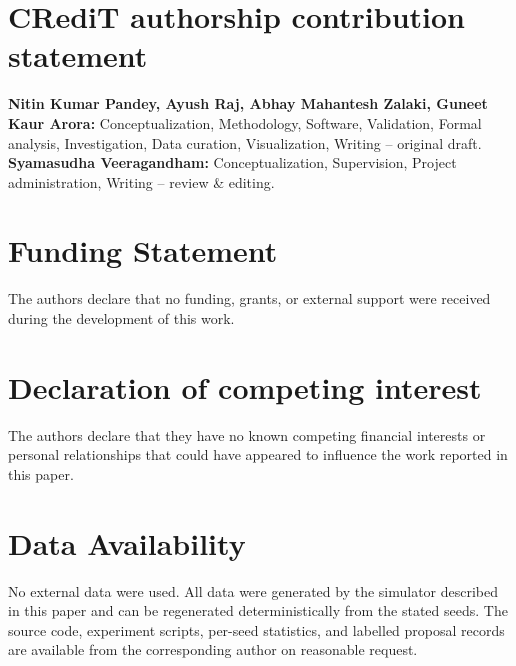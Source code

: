 \documentclass[conference]{IEEEtran}
\begin{document}
\section*{CRediT authorship contribution statement}

\textbf{Nitin Kumar Pandey, Ayush Raj, Abhay Mahantesh Zalaki, Guneet Kaur Arora:} Conceptualization, Methodology, Software, Validation, Formal analysis, Investigation, Data curation, Visualization, Writing -- original draft.
\textbf{Syamasudha Veeragandham:} Conceptualization, Supervision, Project administration, Writing -- review \& editing.

\section*{Funding Statement}

The authors declare that no funding, grants, or external support were received during the development of this work.

\section*{Declaration of competing interest}

The authors declare that they have no known competing financial interests or personal relationships that could have appeared to influence the work reported in this paper.

\section*{Data Availability}

No external data were used. All data were generated by the simulator described in this paper and can be regenerated deterministically from the stated seeds. The source code, experiment scripts, per-seed statistics, and labelled proposal records are available from the corresponding author on reasonable request.
\end{document}
